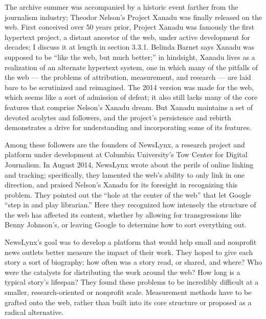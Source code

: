 The archive summer was accompanied by a historic event farther from the journalism industry; Theodor Nelson's Project Xanadu was finally released on the web. First conceived over 50 years prior, Project Xanadu was famously the first hypertext project, a distant ancestor of the web, under active development for decades; I discuss it at length in section 3.3.1. Belinda Barnet says Xanadu was supposed to be ``like the web, but much better;'' in hindsight, Xanadu lives as a realization of an alternate hypertext system, one in which many of the pitfalls of the web --- the problems of attribution, measurement, and research --- are laid bare to be scrutinized and reimagined.\autocite[``The Magical Place of Literary Memory: Xanadu'']{barnet_memory_2013} The 2014 version was made for the web, which seems like a sort of admission of defeat; it also still lacks many of the core features that comprise Nelson's Xanadu dream. But Xanadu maintains a set of devoted acolytes and followers, and the project's persistence and rebirth demonstrates a drive for understanding and incorporating some of its features.

Among these followers are the founders of NewsLynx, a research project and platform under development at Columbia University's Tow Center for Digital Journalism. In August 2014, NewsLynx wrote about the perils of online linking and tracking; specifically, they lamented the web's ability to only link in one direction, and praised Nelson's Xanadu for its foresight in recognizing this problem. They pointed out the ``hole at the center of the web'' that let Google ``step in and play librarian.''\autocite{abelson_hyper-compensation:_2014} Here they recognized how intensely the structure of the web has affected its content, whether by allowing for transgressions like Benny Johnson's, or leaving Google to determine how to sort everything out.

NewsLynx's goal was to develop a platform that would help small and nonprofit news outlets better measure the impact of their work. They hoped to give each story a sort of biography; how often was a story read, or shared, and where? Who were the catalysts for distributing the work around the web? How long is a typical story's lifespan? They found these problems to be incredibly difficult at a smaller, research-oriented or nonprofit scale. Measurement methods have to be grafted onto the web, rather than built into its core structure or proposed as a radical alternative.

